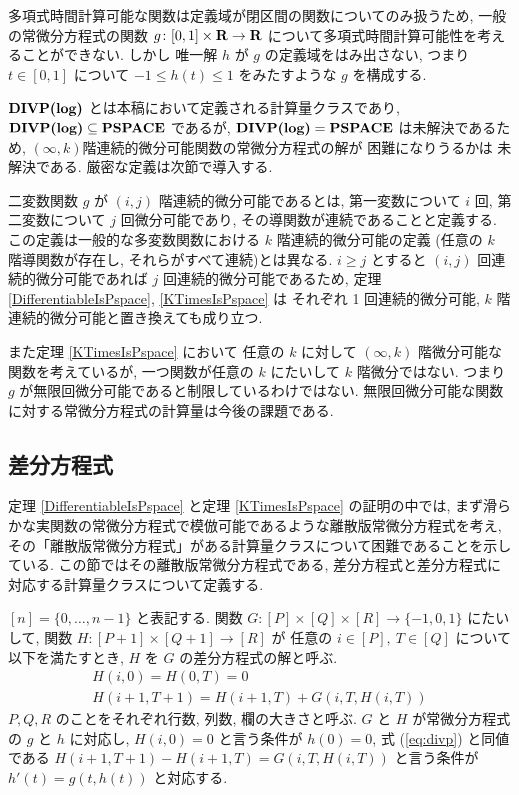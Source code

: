  多項式時間計算可能な関数は定義域が閉区間の関数についてのみ扱うため,
 一般の常微分方程式の関数 $g \colon [0,1] \times \mathbf R \to \mathbf R$ 
 について多項式時間計算可能性を考えることができない.
 しかし 唯一解 $h$ が $g$ の定義域をはみ出さない, つまり
 $t \in [0, 1]$ について $-1 \le h(t) \le 1$ をみたすような $g$ を構成する.

 $\text{\bf DIVP(log)}$ とは本稿において定義される計算量クラスであり,
 $\text{\bf DIVP(log)} \subseteq {\bf PSPACE}$ であるが, $\text{\bf DIVP(log)} = {\bf PSPACE}$ は未解決であるため,
 $(\infty, k)$階連続的微分可能関数の常微分方程式の解が \PSPACE 困難になりうるかは
 未解決である.
 厳密な定義は次節で導入する.

 二変数関数 $g$ が $(i, j)$ 階連続的微分可能であるとは,
 第一変数について $i$ 回, 第二変数について $j$ 回微分可能であり,
 その導関数が連続であることと定義する.
 この定義は一般的な多変数関数における $k$ 階連続的微分可能の定義
 (任意の $k$ 階導関数が存在し, それらがすべて連続)とは異なる.
 $i \ge j$ とすると $(i,j)$ 回連続的微分可能であれば $j$ 回連続的微分可能であるため,
 定理 \ref{DifferentiableIsPspace}, \ref{KTimesIsPspace} は
 それぞれ 1 回連続的微分可能, $k$ 階連続的微分可能と置き換えても成り立つ.

 また定理 \ref{KTimesIsPspace} において
 任意の $k$ に対して $(\infty, k)$ 階微分可能な関数を考えているが,
 一つ関数が任意の $k$ にたいして $k$ 階微分ではない.
 つまり $g$ が無限回微分可能であると制限しているわけではない. 
 無限回微分可能な関数に対する常微分方程式の計算量は今後の課題である.





\subsection{差分方程式}
\label{section:divp}

定理 \ref{DifferentiableIsPspace} と定理 \ref{KTimesIsPspace} の証明の中では,
まず滑らかな実関数の常微分方程式で模倣可能であるような離散版常微分方程式を考え, 
その「離散版常微分方程式」がある計算量クラスについて困難であることを示している.
この節ではその離散版常微分方程式である, 
差分方程式と差分方程式に対応する計算量クラスについて定義する.



$[n] = \{0, \dots , n-1\}$ と表記する.
関数 $G \colon [P] \times [Q] \times [R] \to \{-1, 0, 1\}$ にたいして,
関数 $H \colon [P + 1] \times [Q+1] \to [R]$ が
任意の $i \in [P],\ T \in [Q]$ について以下を満たすとき,
$H$ を $G$ の差分方程式の解と呼ぶ.
\begin{gather}
   H(i, 0) = H(0, T) = 0 
\\
   H(i + 1, T + 1) = H(i+1, T) + G(i, T, H(i, T))  \label{eq:divp}
\end{gather}
$P, Q, R$ のことをそれぞれ行数, 列数, 欄の大きさと呼ぶ.
$G$ と $H$ が常微分方程式の $g$ と $h$ に対応し,
$H(i, 0) = 0$ と言う条件が $h(0) = 0$,
式 (\ref{eq:divp}) と同値である $H(i + 1, T + 1) - H(i+1, T) = G(i, T, H(i, T))$
と言う条件が $h'(t) = g(t, h(t))$ と対応する.

